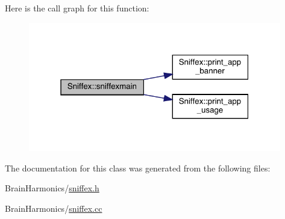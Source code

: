 Here is the call graph for this function\+:\nopagebreak
\begin{figure}[H]
\begin{center}
\leavevmode
\includegraphics[width=313pt]{class_sniffex_a41e146d588c285c94c0beee223d8552b_cgraph}
\end{center}
\end{figure}


The documentation for this class was generated from the following files\+:\begin{DoxyCompactItemize}
\item 
Brain\+Harmonics/\hyperlink{sniffex_8h}{sniffex.\+h}\item 
Brain\+Harmonics/\hyperlink{sniffex_8cc}{sniffex.\+cc}\end{DoxyCompactItemize}
